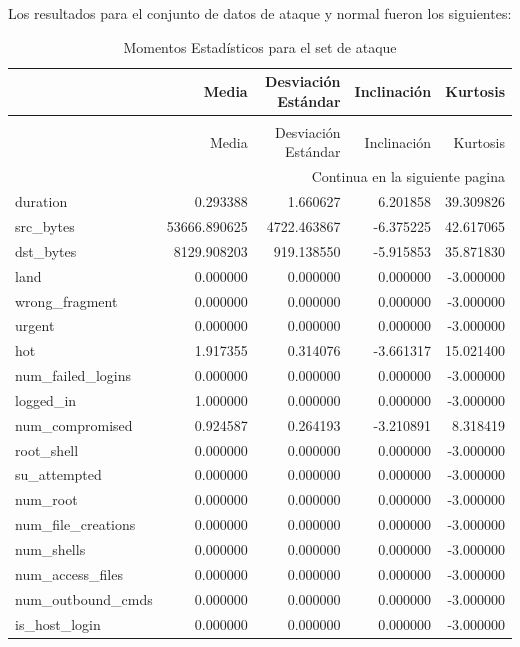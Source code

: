 \documentclass[12pt,a4paper]{article}
\begin{document}
Los resultados para el conjunto de datos de ataque y normal fueron los siguientes:

\begin{longtable}{lrrrr}
  \caption{Momentos Estadísticos para el set de ataque} \\
  \toprule
  & Media & Desviación Estándar & Inclinación & Kurtosis \\
  \midrule
  \endfirsthead
  \caption[]{Momentos Estadísticos para el set de ataque} \\
  \toprule
  & Media & Desviación Estándar & Inclinación & Kurtosis \\
  \midrule
  \endhead
  \midrule
  \multicolumn{5}{r}{Continua en la siguiente pagina} \\
  \midrule
  \endfoot
  \bottomrule
  \endlastfoot
  duration & 0.293388 & 1.660627 & 6.201858 & 39.309826 \\
  src_bytes & 53666.890625 & 4722.463867 & -6.375225 & 42.617065 \\
  dst_bytes & 8129.908203 & 919.138550 & -5.915853 & 35.871830 \\
  land & 0.000000 & 0.000000 & 0.000000 & -3.000000 \\
  wrong_fragment & 0.000000 & 0.000000 & 0.000000 & -3.000000 \\
  urgent & 0.000000 & 0.000000 & 0.000000 & -3.000000 \\
  hot & 1.917355 & 0.314076 & -3.661317 & 15.021400 \\
  num_failed_logins & 0.000000 & 0.000000 & 0.000000 & -3.000000 \\
  logged_in & 1.000000 & 0.000000 & 0.000000 & -3.000000 \\
  num_compromised & 0.924587 & 0.264193 & -3.210891 & 8.318419 \\
  root_shell & 0.000000 & 0.000000 & 0.000000 & -3.000000 \\
  su_attempted & 0.000000 & 0.000000 & 0.000000 & -3.000000 \\
  num_root & 0.000000 & 0.000000 & 0.000000 & -3.000000 \\
  num_file_creations & 0.000000 & 0.000000 & 0.000000 & -3.000000 \\
  num_shells & 0.000000 & 0.000000 & 0.000000 & -3.000000 \\
  num_access_files & 0.000000 & 0.000000 & 0.000000 & -3.000000 \\
  num_outbound_cmds & 0.000000 & 0.000000 & 0.000000 & -3.000000 \\
  is_host_login & 0.000000 & 0.000000 & 0.000000 & -3.000000 \\

\end{longtable}
\end{document}
